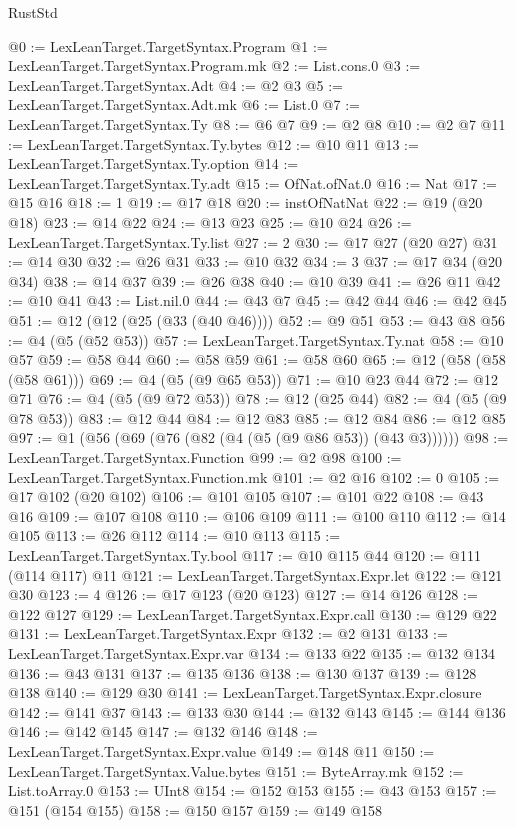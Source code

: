 \begin{lexlean}{RustStd}
\begin{coremodule}
@0 := LexLeanTarget.TargetSyntax.Program
@1 := LexLeanTarget.TargetSyntax.Program.mk
@2 := List.cons.{0}
@3 := LexLeanTarget.TargetSyntax.Adt
@4 := @2 @3
@5 := LexLeanTarget.TargetSyntax.Adt.mk
@6 := List.{0}
@7 := LexLeanTarget.TargetSyntax.Ty
@8 := @6 @7
@9 := @2 @8
@10 := @2 @7
@11 := LexLeanTarget.TargetSyntax.Ty.bytes
@12 := @10 @11
@13 := LexLeanTarget.TargetSyntax.Ty.option
@14 := LexLeanTarget.TargetSyntax.Ty.adt
@15 := OfNat.ofNat.{0}
@16 := Nat
@17 := @15 @16
@18 := 1
@19 := @17 @18
@20 := instOfNatNat
@22 := @19 (@20 @18)
@23 := @14 @22
@24 := @13 @23
@25 := @10 @24
@26 := LexLeanTarget.TargetSyntax.Ty.list
@27 := 2
@30 := @17 @27 (@20 @27)
@31 := @14 @30
@32 := @26 @31
@33 := @10 @32
@34 := 3
@37 := @17 @34 (@20 @34)
@38 := @14 @37
@39 := @26 @38
@40 := @10 @39
@41 := @26 @11
@42 := @10 @41
@43 := List.nil.{0}
@44 := @43 @7
@45 := @42 @44
@46 := @42 @45
@51 := @12 (@12 (@25 (@33 (@40 @46))))
@52 := @9 @51
@53 := @43 @8
@56 := @4 (@5 (@52 @53))
@57 := LexLeanTarget.TargetSyntax.Ty.nat
@58 := @10 @57
@59 := @58 @44
@60 := @58 @59
@61 := @58 @60
@65 := @12 (@58 (@58 (@58 @61)))
@69 := @4 (@5 (@9 @65 @53))
@71 := @10 @23 @44
@72 := @12 @71
@76 := @4 (@5 (@9 @72 @53))
@78 := @12 (@25 @44)
@82 := @4 (@5 (@9 @78 @53))
@83 := @12 @44
@84 := @12 @83
@85 := @12 @84
@86 := @12 @85
@97 := @1 (@56 (@69 (@76 (@82 (@4 (@5 (@9 @86 @53)) (@43 @3))))))
@98 := LexLeanTarget.TargetSyntax.Function
@99 := @2 @98
@100 := LexLeanTarget.TargetSyntax.Function.mk
@101 := @2 @16
@102 := 0
@105 := @17 @102 (@20 @102)
@106 := @101 @105
@107 := @101 @22
@108 := @43 @16
@109 := @107 @108
@110 := @106 @109
@111 := @100 @110
@112 := @14 @105
@113 := @26 @112
@114 := @10 @113
@115 := LexLeanTarget.TargetSyntax.Ty.bool
@117 := @10 @115 @44
@120 := @111 (@114 @117) @11
@121 := LexLeanTarget.TargetSyntax.Expr.let
@122 := @121 @30
@123 := 4
@126 := @17 @123 (@20 @123)
@127 := @14 @126
@128 := @122 @127
@129 := LexLeanTarget.TargetSyntax.Expr.call
@130 := @129 @22
@131 := LexLeanTarget.TargetSyntax.Expr
@132 := @2 @131
@133 := LexLeanTarget.TargetSyntax.Expr.var
@134 := @133 @22
@135 := @132 @134
@136 := @43 @131
@137 := @135 @136
@138 := @130 @137
@139 := @128 @138
@140 := @129 @30
@141 := LexLeanTarget.TargetSyntax.Expr.closure
@142 := @141 @37
@143 := @133 @30
@144 := @132 @143
@145 := @144 @136
@146 := @142 @145
@147 := @132 @146
@148 := LexLeanTarget.TargetSyntax.Expr.value
@149 := @148 @11
@150 := LexLeanTarget.TargetSyntax.Value.bytes
@151 := ByteArray.mk
@152 := List.toArray.{0}
@153 := UInt8
@154 := @152 @153
@155 := @43 @153
@157 := @151 (@154 @155)
@158 := @150 @157
@159 := @149 @158

\end{coremodule}
\end{lexlean}
